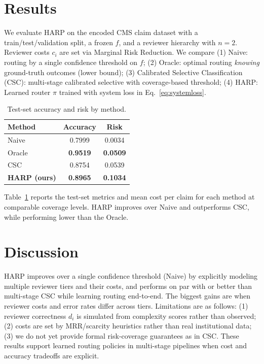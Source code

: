 \documentclass[conference]{IEEEtran}
\begin{document}
\section{Results}

We evaluate HARP on the encoded CMS claim dataset with a train/test/validation split, a frozen
$f$, and a reviewer hierarchy with $n=2$. Reviewer costs $c_i$ are set via Marginal Risk Reduction.
We compare (1) Naive: routing by a single confidence threshold on $f$; (2) Oracle: optimal routing 
\textit{knowing} ground-truth outcomes (lower bound); (3) Calibrated Selective Classification (CSC):
multi-stage calibrated selective with coverage-based threshold; (4) HARP: Learned router $\pi$ trained 
with system loss in Eq.~\ref{eq:systemloss}. 

\begin{table}[h!]
\centering
\caption{Test-set accuracy and risk by method.}
\label{tab:results}
\begin{tabular}{lcc}
\toprule
Method & Accuracy & Risk \\
\midrule
Naive  & 0.7999 & 0.0034 \\
Oracle & \textbf{0.9519} & \textbf{0.0509} \\
CSC    & 0.8754 & 0.0539 \\
\textbf{HARP (ours)} & \textbf{0.8965} & \textbf{0.1034} \\
\bottomrule
\end{tabular}
\end{table}

Table~\ref{tab:results} reports the test-set metrics and mean cost per claim for each method at comparable
coverage levels. HARP improves over Naive and outperforms CSC, while performing lower than the Oracle. 

\section{Discussion}

HARP improves over a single confidence threshold (Naive) by explicitly modeling 
multiple reviewer tiers and their costs, and performs on par with or better than 
multi-stage CSC while learning routing end-to-end. The biggest gains are when reviewer 
costs and error rates differ across tiers. Limitations are as follows: (1) reviewer correctness 
$d_i$ is simulated from complexity scores rather than observed; (2) costs are set by MRR/scarcity
heuristics rather than real institutional data; (3) we do not yet provide formal risk-coverage 
guarantees as in CSC. These results support learned routing policies in multi-stage pipelines when 
cost and accuracy tradeoffs are explicit.
\end{document}
